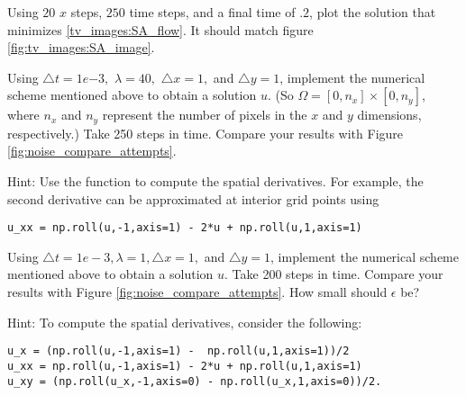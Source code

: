 
Using $20$ $x$ steps, $250$ time steps, and a final time of $.2$, plot the solution that minimizes \eqref{tv_images:SA_flow}.
It should match figure \ref{fig:tv_images:SA_image}.


Using $\triangle t = 1e{-3},$ $\lambda = 40,$ $\triangle x = 1,$ and $\triangle y = 1$, implement the numerical scheme mentioned above to obtain a solution $u$. (So $\Omega = [0,n_x]\times [0,n_y]$, where $n_x$ and $n_y$ represent the number of pixels in the $x$ and $y$ dimensions, respectively.) Take 250 steps in time. Compare your results with Figure \ref{fig:noise_compare_attempts}.

Hint: Use the function  to compute the spatial derivatives. For example, the second derivative can be approximated at interior grid points using 
\begin{lstlisting}
u_xx = np.roll(u,-1,axis=1) - 2*u + np.roll(u,1,axis=1)	
\end{lstlisting}

Using $\triangle t = 1e-3, \lambda = 1, \triangle x = 1,$ and $ \triangle y = 1$, implement the numerical scheme mentioned above to obtain a solution $u$.  Take 200 steps in time. Compare your results with Figure \ref{fig:noise_compare_attempts}. How small should $\epsilon$ be? 

Hint: To compute the spatial derivatives, consider the following: 
\begin{lstlisting}
u_x = (np.roll(u,-1,axis=1) -  np.roll(u,1,axis=1))/2	
u_xx = np.roll(u,-1,axis=1) - 2*u + np.roll(u,1,axis=1)	
u_xy = (np.roll(u_x,-1,axis=0) - np.roll(u_x,1,axis=0))/2.
\end{lstlisting}
